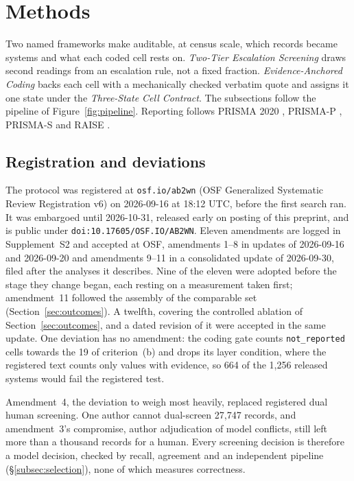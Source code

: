 \section{Methods}\label{sec:methods}

Two named frameworks make auditable, at census scale, which records became systems and what each coded
cell rests on. \emph{Two-Tier Escalation Screening} draws second readings from an escalation rule, not a
fixed fraction. \emph{Evidence-Anchored Coding} backs each cell with a mechanically checked verbatim quote
and assigns it one state under the \emph{Three-State Cell Contract}. The subsections follow the pipeline
of Figure~\ref{fig:pipeline}. Reporting follows PRISMA 2020 \citep{page2021prisma,page2021prismaexplanation}, PRISMA-P
\citep{shamseer2015prismap}, PRISMA-S \citep{rethlefsen2021prismas} and RAISE
\citep{thomas2025raise,flemyng2025aiposition}.

\subsection{Registration and deviations}\label{subsec:registration}

The protocol was registered at \texttt{osf.io/ab2wn} (OSF Generalized Systematic Review Registration v6) on
2026-09-16 at 18:12 UTC, before the first search ran. It was embargoed until 2026-10-31, released early
on posting of this preprint, and is public under \texttt{doi:10.17605/OSF.IO/AB2WN}. Eleven amendments are logged in
Supplement~S2 and accepted at OSF, amendments 1--8 in updates of 2026-09-16 and 2026-09-20 and
amendments 9--11 in a consolidated update of 2026-09-30, filed after the analyses it describes. Nine of the eleven were adopted before
the stage they change began, each resting on a measurement taken first; amendment~11 followed the
assembly of the comparable set (Section~\ref{sec:outcomes}). A twelfth, covering the controlled ablation
of Section~\ref{sec:outcomes}, and a dated revision of it were accepted in the same update. One
deviation has no amendment: the coding gate counts \texttt{not\_reported} cells
towards the 19 of criterion~(b) and drops its layer condition, where the registered text counts only
values with evidence, so 664 of the 1,256 released systems would fail the registered test.

Amendment~4, the deviation to weigh most heavily, replaced registered dual human screening. One author
cannot dual-screen 27,747 records, and amendment~3's compromise, author adjudication of model conflicts,
still left more than a thousand records for a human. Every screening decision is therefore a model
decision, checked by recall, agreement and an independent pipeline (\S\ref{subsec:selection}), none of
which measures correctness.

